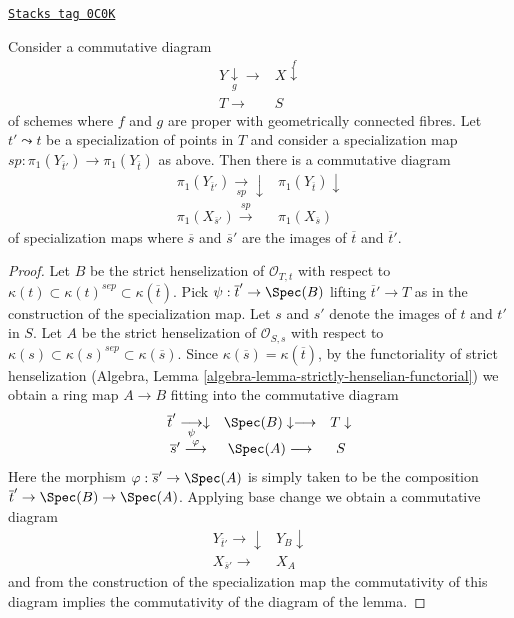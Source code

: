 \begin{lemma}
\label{pione-lemma-specialization-map-base-change}
\href{https://stacks.math.columbia.edu/tag/0C0K}{\texttt{Stacks tag 0C0K}}

Consider a commutative diagram
$$
\begin{array}{cc}Y \underset{g}{\downarrow}\longrightarrow & X \overset{f}{\downarrow} \\ T \longrightarrow & S\end{array}
$$
of schemes where $f$ and $g$ are proper with geometrically connected
fibres. Let $t' \leadsto t$ be a specialization of points in $T$
and consider a specialization map
$sp : \pi_1(Y_{\overline{t}'}) \to \pi_1(Y_{\overline{t}})$ as above.
Then there is a commutative diagram
$$
\begin{array}{cc}\pi_1(Y_{\overline{t}'}) \underset{sp}{\longrightarrow}\downarrow & \pi_1(Y_{\overline{t}}) \downarrow \\ \pi_1(X_{\overline{s}'}) \overset{sp}{\longrightarrow} & \pi_1(X_{\overline{s}})\end{array}
$$
of specialization maps where $\overline{s}$ and $\overline{s}'$
are the images of $\overline{t}$ and $\overline{t}'$.
\end{lemma}

\begin{proof}
Let $B$ be the strict henselization of $\mathcal{O}_{T, t}$ with respect to
$\kappa(t) \subset \kappa(t)^{sep} \subset \kappa(\overline{t})$.
Pick $\psi : \overline{t}' \to \Spec(B)$ lifting $\overline{t}' \to T$
as in the construction of the specialization map.
Let $s$ and $s'$ denote the images of $t$ and $t'$ in $S$.
Let $A$ be the strict henselization of $\mathcal{O}_{S, s}$
with respect to
$\kappa(s) \subset \kappa(s)^{sep} \subset \kappa(\overline{s})$.
Since $\kappa(\overline{s}) = \kappa(\overline{t})$,
by the functoriality of strict henselization
(Algebra, Lemma \ref{algebra-lemma-strictly-henselian-functorial})
we obtain a ring map $A \to B$ fitting into the commutative diagram
$$
\begin{array}{ccc}\overline{t}' \underset{\psi}{\longrightarrow}\downarrow & \Spec(B) \downarrow\longrightarrow & T \downarrow \\ \overline{s}' \overset{\varphi}{\longrightarrow} & \Spec(A) \longrightarrow & S\end{array}
$$
Here the morphism $\varphi : \overline{s}' \to \Spec(A)$ is simply taken
to be the composition $\overline{t}' \to \Spec(B) \to \Spec(A)$.
Applying base change we obtain a commutative diagram
$$
\begin{array}{cc}Y_{\overline{t}'} \longrightarrow\downarrow & Y_B \downarrow \\ X_{\overline{s}'} \longrightarrow & X_A\end{array}
$$
and from the construction of the specialization map the commutativity
of this diagram implies the commutativity of the diagram of the lemma.
\end{proof}

